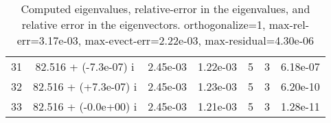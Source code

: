 \begin{table}[H]
\begin{center}
\begin{tabular}{|c|c|c|c|c|c|c|}
    31  &     82.516 + (-7.3e-07) i  &    2.45e-03      &   1.22e-03    &   5    &  3   &    6.18e-07 \\
    32  &     82.516 + (+7.3e-07) i  &    2.45e-03      &   1.23e-03    &   5    &  3   &    6.20e-10 \\
    33  &     82.516 + (-0.0e+00) i  &    2.45e-03      &   1.21e-03    &   5    &  3   &    1.28e-11 \\
\hline
\end{tabular}
\caption{Computed eigenvalues, relative-error in the eigenvalues, and relative error in the eigenvectors. orthogonalize=1, max-rel-err=3.17e-03, max-evect-err=2.22e-03, max-residual=4.30e-06
}\label{table:genEigsspheree4.order2.hdf}
\end{center}
\end{table}
